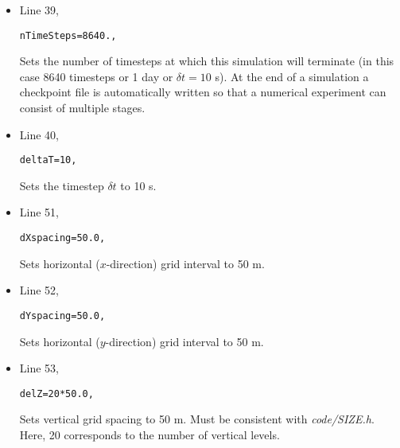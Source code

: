 \begin{itemize}
\item Line 39,
\begin{verbatim}
nTimeSteps=8640.,
\end{verbatim}
Sets the number of timesteps at which this simulation will terminate (in this case
8640 timesteps or 1 day or $\delta t = 10$ s). 
At the end of a simulation a checkpoint file is automatically
written so that a numerical experiment can consist of multiple
stages.

\item Line 40,
\begin{verbatim}
deltaT=10,
\end{verbatim}
Sets the timestep $\delta t$  to 10 s.


\item Line 51,
\begin{verbatim}
dXspacing=50.0,
\end{verbatim}
Sets horizontal ($x$-direction) grid interval to 50 m. 


\item Line 52,
\begin{verbatim}
dYspacing=50.0,
\end{verbatim}
Sets horizontal ($y$-direction) grid interval to 50 m. 


\item Line 53,
\begin{verbatim}
delZ=20*50.0,
\end{verbatim}
Sets vertical grid spacing to 50 m. Must be consistent with {\it code/SIZE.h}. Here,
20 corresponds to the number of vertical levels.


\end{itemize}
